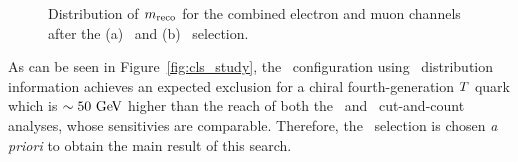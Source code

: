 \begin{figure}[htb]\begin{center}
	\caption[bla]{Distribution of $m_{\rm reco}$  for the combined electron and muon channels after the (a) \loose\ and (b) \tight\ selection.
        \label{fig:mrecoBIS}}
\end{center}\end{figure}




As can be seen in Figure~\ref{fig:cls_study}, the \tight\ configuration using 
\mreco\ distribution information achieves an expected
exclusion for a chiral fourth-generation $\T$ quark which is $\sim 50\gev$ 
higher than the reach of both the
\loose\ and \tight\ cut-and-count analyses, whose sensitivies are comparable.
Therefore, the \tight\ selection is chosen 
{\it a priori} to obtain the main result of this search.

